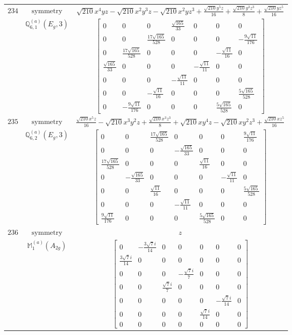 \documentclass[fleqn,8pt,landscape]{jsarticle}
\begin{document}
\begin{longtable}{ccc}
$ 234 $ & $ \text{symmetry} $ & $ \sqrt{210} x^{4} y z - \sqrt{210} x^{2} y^{3} z - \sqrt{210} x^{2} y z^{3} + \frac{\sqrt{210} y^{5} z}{16} + \frac{\sqrt{210} y^{3} z^{3}}{8} + \frac{\sqrt{210} y z^{5}}{16} $ \\
$  $ & $ \mathbb{Q}_{6,1}^{(a)}(E_{g},3) $ & $ \begin{bmatrix} 0 & 0 & 0 & \frac{\sqrt{165}}{33} & 0 & 0 & 0 \\ 0 & 0 & \frac{17 \sqrt{165}}{528} & 0 & 0 & 0 & - \frac{9 \sqrt{11}}{176} \\ 0 & \frac{17 \sqrt{165}}{528} & 0 & 0 & 0 & - \frac{\sqrt{11}}{16} & 0 \\ \frac{\sqrt{165}}{33} & 0 & 0 & 0 & - \frac{\sqrt{11}}{11} & 0 & 0 \\ 0 & 0 & 0 & - \frac{\sqrt{11}}{11} & 0 & 0 & 0 \\ 0 & 0 & - \frac{\sqrt{11}}{16} & 0 & 0 & 0 & \frac{5 \sqrt{165}}{528} \\ 0 & - \frac{9 \sqrt{11}}{176} & 0 & 0 & 0 & \frac{5 \sqrt{165}}{528} & 0 \end{bmatrix} $ \\ \hline
$ 235 $ & $ \text{symmetry} $ & $ \frac{\sqrt{210} x^{5} z}{16} - \sqrt{210} x^{3} y^{2} z + \frac{\sqrt{210} x^{3} z^{3}}{8} + \sqrt{210} x y^{4} z - \sqrt{210} x y^{2} z^{3} + \frac{\sqrt{210} x z^{5}}{16} $ \\
$  $ & $ \mathbb{Q}_{6,2}^{(a)}(E_{g},3) $ & $ \begin{bmatrix} 0 & 0 & \frac{17 \sqrt{165}}{528} & 0 & 0 & 0 & \frac{9 \sqrt{11}}{176} \\ 0 & 0 & 0 & - \frac{\sqrt{165}}{33} & 0 & 0 & 0 \\ \frac{17 \sqrt{165}}{528} & 0 & 0 & 0 & \frac{\sqrt{11}}{16} & 0 & 0 \\ 0 & - \frac{\sqrt{165}}{33} & 0 & 0 & 0 & - \frac{\sqrt{11}}{11} & 0 \\ 0 & 0 & \frac{\sqrt{11}}{16} & 0 & 0 & 0 & \frac{5 \sqrt{165}}{528} \\ 0 & 0 & 0 & - \frac{\sqrt{11}}{11} & 0 & 0 & 0 \\ \frac{9 \sqrt{11}}{176} & 0 & 0 & 0 & \frac{5 \sqrt{165}}{528} & 0 & 0 \end{bmatrix} $ \\ \hline
$ 236 $ & $ \text{symmetry} $ & $ z $ \\
$  $ & $ \mathbb{M}_{1}^{(a)}(A_{2g}) $ & $ \begin{bmatrix} 0 & - \frac{3 \sqrt{7} i}{14} & 0 & 0 & 0 & 0 & 0 \\ \frac{3 \sqrt{7} i}{14} & 0 & 0 & 0 & 0 & 0 & 0 \\ 0 & 0 & 0 & - \frac{\sqrt{7} i}{7} & 0 & 0 & 0 \\ 0 & 0 & \frac{\sqrt{7} i}{7} & 0 & 0 & 0 & 0 \\ 0 & 0 & 0 & 0 & 0 & - \frac{\sqrt{7} i}{14} & 0 \\ 0 & 0 & 0 & 0 & \frac{\sqrt{7} i}{14} & 0 & 0 \\ 0 & 0 & 0 & 0 & 0 & 0 & 0 \end{bmatrix} $ \\ \hline

\end{longtable}
\end{document}
